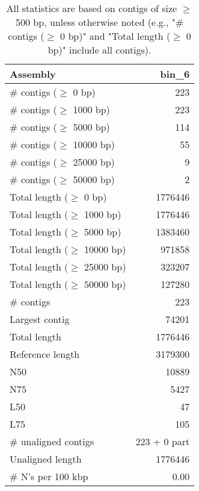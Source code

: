 \documentclass[12pt,a4paper]{article}
\begin{document}
\begin{table}[ht]
\begin{center}
\caption{All statistics are based on contigs of size $\geq$ 500 bp, unless otherwise noted (e.g., "\# contigs ($\geq$ 0 bp)" and "Total length ($\geq$ 0 bp)" include all contigs).}
\begin{tabular}{|l*{1}{|r}|}
\hline
Assembly & bin\_6 \\ \hline
\# contigs ($\geq$ 0 bp) & 223 \\ \hline
\# contigs ($\geq$ 1000 bp) & 223 \\ \hline
\# contigs ($\geq$ 5000 bp) & 114 \\ \hline
\# contigs ($\geq$ 10000 bp) & 55 \\ \hline
\# contigs ($\geq$ 25000 bp) & 9 \\ \hline
\# contigs ($\geq$ 50000 bp) & 2 \\ \hline
Total length ($\geq$ 0 bp) & 1776446 \\ \hline
Total length ($\geq$ 1000 bp) & 1776446 \\ \hline
Total length ($\geq$ 5000 bp) & 1383460 \\ \hline
Total length ($\geq$ 10000 bp) & 971858 \\ \hline
Total length ($\geq$ 25000 bp) & 323207 \\ \hline
Total length ($\geq$ 50000 bp) & 127280 \\ \hline
\# contigs & 223 \\ \hline
Largest contig & 74201 \\ \hline
Total length & 1776446 \\ \hline
Reference length & 3179300 \\ \hline
N50 & 10889 \\ \hline
N75 & 5427 \\ \hline
L50 & 47 \\ \hline
L75 & 105 \\ \hline
\# unaligned contigs & 223 + 0 part \\ \hline
Unaligned length & 1776446 \\ \hline
\# N's per 100 kbp & 0.00 \\ \hline
\end{tabular}
\end{center}
\end{table}
\end{document}
